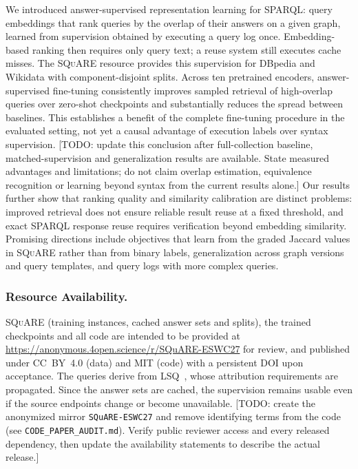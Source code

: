 \documentclass[runningheads]{llncs}
\newcommand{\squareds}{\textsc{SQuARE}}
\newcommand{\hp}[1]{{\color{red!75!black}#1}}
\begin{document}
We introduced answer-supervised representation learning for SPARQL: query
embeddings that rank queries by the overlap of their answers on a given graph,
learned
from supervision obtained by executing a query log once. Embedding-based
ranking then requires only query text; a reuse system still executes cache
misses. The \squareds{} resource provides this
supervision for DBpedia and Wikidata with component-disjoint splits. Across
ten pretrained encoders, answer-supervised fine-tuning consistently improves
sampled retrieval of high-overlap queries over zero-shot checkpoints and
substantially reduces the spread between baselines. This establishes a
benefit of the complete fine-tuning procedure in the evaluated setting,
not yet a causal advantage of execution labels over syntax supervision.
\hp{[TODO: update this conclusion after full-collection baseline,
matched-supervision and generalization results are available. State measured
advantages and limitations; do not claim overlap estimation, equivalence
recognition or learning beyond syntax from the current results alone.]} Our results further show that ranking quality and
similarity calibration are distinct problems: improved retrieval does not
ensure reliable result reuse at a fixed threshold, and exact SPARQL response
reuse requires verification beyond embedding similarity.
Promising directions include objectives
that learn from the graded Jaccard
values in \squareds{} rather than from binary labels, generalization across
graph versions and query templates, and query logs with more complex queries.

\subsubsection*{Resource Availability.}
\label{sec:availability}
\squareds{} (training instances, cached answer sets and splits), the trained checkpoints
and all code are intended to be provided at
\url{https://anonymous.4open.science/r/SQuARE-ESWC27} for review, and
published under CC~BY~4.0 (data) and MIT (code) with a persistent DOI upon
acceptance. The queries derive from LSQ~\cite{saleem2015lsq}, whose
attribution requirements are propagated. Since the answer sets are cached,
the supervision remains usable even if the source endpoints change or become
unavailable.
\hp{[TODO: create the anonymized mirror \texttt{SQuARE-ESWC27} and remove
identifying terms from the code (see \texttt{CODE\_PAPER\_AUDIT.md}). Verify
public reviewer access and every released dependency, then update the
availability statements to describe the actual release.]}
\end{document}
